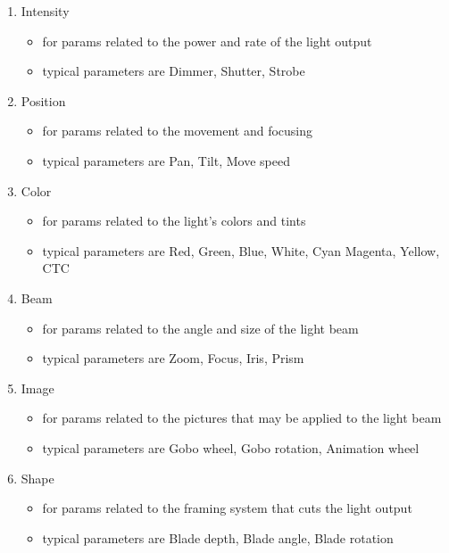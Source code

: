 \documentclass[
]{article}
\begin{document}
\begin{enumerate}
\def\labelenumi{\arabic{enumi}.}
\item
  Intensity

  \begin{itemize}
  \item
    for params related to the power and rate of the light output
  \item
    typical parameters are Dimmer, Shutter, Strobe
  \end{itemize}
\item
  Position

  \begin{itemize}
  \item
    for params related to the movement and focusing
  \item
    typical parameters are Pan, Tilt, Move speed
  \end{itemize}
\item
  Color

  \begin{itemize}
  \item
    for params related to the light's colors and tints
  \item
    typical parameters are Red, Green, Blue, White, Cyan Magenta, Yellow, CTC
  \end{itemize}
\item
  Beam

  \begin{itemize}
  \item
    for params related to the angle and size of the light beam
  \item
    typical parameters are Zoom, Focus, Iris, Prism
  \end{itemize}
\item
  Image

  \begin{itemize}
  \item
    for params related to the pictures that may be applied to the light beam
  \item
    typical parameters are Gobo wheel, Gobo rotation, Animation wheel
  \end{itemize}
\item
  Shape

  \begin{itemize}
  \item
    for params related to the framing system that cuts the light output
  \item
    typical parameters are Blade depth, Blade angle, Blade rotation
  \end{itemize}
\end{enumerate}
\end{document}
